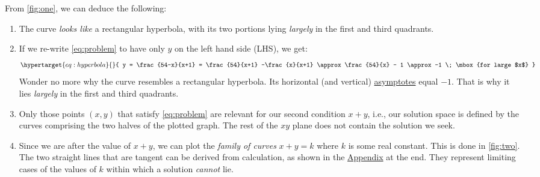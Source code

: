 \documentclass[
  a4paper,
]{article}
\begin{document}
From \cref{fig:one}, we can deduce the following:

\begin{enumerate}
\def\labelenumi{(\alph{enumi})}
\item
  The curve \emph{looks like} a rectangular hyperbola, with its two
  portions lying \emph{largely} in the first and third quadrants.
\item
  If we re-write \cref{eq:problem} to have only \(y\) on the left hand
  side (LHS), we get:
  \begin{equation}\protect\hypertarget{eq:hyperbola}{}{
  y = \frac{54-x}{x+1} = \frac{54}{x+1} -\frac{x}{x+1} \approx \frac{54}{x} - 1 \approx -1 \; \mbox{for large $x$}
  }\label{eq:hyperbola}\end{equation} Wonder no more why the curve
  resembles a rectangular hyperbola. Its horizontal (and vertical)
  \href{https://en.wikipedia.org/wiki/Asymptote}{asymptotes} equal
  \(-1\). That is why it lies \emph{largely} in the first and third
  quadrants.
\item
  Only those points \((x, y)\) that satisfy \cref{eq:problem} are
  relevant for our second condition \(x + y\), i.e., our solution space
  is defined by the curves comprising the two halves of the plotted
  graph. The rest of the \(xy\) plane does not contain the solution we
  seek.
\item
  Since we are after the value of \(x + y\), we can plot the
  \emph{family of curves} \(x + y = k\) where \(k\) is some real
  constant. This is done in \cref{fig:two}. The two straight lines that
  are tangent can be derived from calculation, as shown in the
  \protect\hyperlink{appendix}{Appendix} at the end. They represent
  limiting cases of the values of \(k\) within which a solution
  \emph{cannot} lie.
\end{enumerate}
\end{document}
